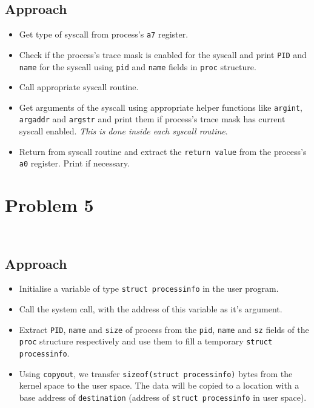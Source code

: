 \documentclass[11pt,a4paper,english]{paper}
\newenvironment{colorboxed}[4][gray]{
\begin{tcolorbox}[colback=#1!3!white,colframe=#1(ryb)!50!black,title=\textbf{#2: #3},#4]
}{
\end{tcolorbox}
}
\begin{document}
\subsection*{Approach}
\begin{itemize}[noitemsep, nolistsep]
    \item Get type of syscall from process's \texttt{a7} register.
    \item Check if the process's trace mask is enabled for the syscall and print \texttt{PID} and \texttt{name} for the syscall using \texttt{pid} and \texttt{name} fields in \texttt{proc} structure.
    \item Call appropriate syscall routine.
    \item Get arguments of the syscall using appropriate helper functions like \texttt{argint}, \texttt{argaddr} and \texttt{argstr} and print them if process's trace mask has current syscall enabled. \textit{This is done inside each syscall routine}.
    \item Return from syscall routine and extract the \texttt{return value} from the process's \texttt{a0} register. Print if necessary.
\end{itemize}
\section*{Problem 5}
\begin{colorboxed}{Code}{\texttt{kernel/sysproc.c::\textit{sys\_get\_process\_info()}}}{unbreakable}
    \inputminted[baselinestretch=0.85,firstline=157,breaklines]{c}{kernel/sysproc.c}
\end{colorboxed}
\begin{colorboxed}{Code}{\texttt{user/test\_program\_5.c::\textit{main()}}}{unbreakable}
    \inputminted[baselinestretch=0.85,firstline=1,lastline=19,breaklines]{c}{user/test_program_5.c}
\end{colorboxed}
\subsection*{Approach}
\begin{itemize}[noitemsep, nolistsep]
    \item Initialise a variable of type \texttt{struct processinfo} in the user program.
    \item Call the system call, with the address of this variable as it's argument.
    \item Extract \texttt{PID}, \texttt{name} and \texttt{size} of process from the \texttt{pid}, \texttt{name} and \texttt{sz} fields of the \texttt{proc} structure respectively and use them to fill a temporary \texttt{struct processinfo}.
    \item Using \texttt{copyout}, we transfer \texttt{sizeof(struct processinfo)} bytes from the kernel space to the user space. The data will be copied to a location with a base address of \texttt{destination} (address of \texttt{struct processinfo} in user space).
\end{itemize}



%
%
\end{document}
